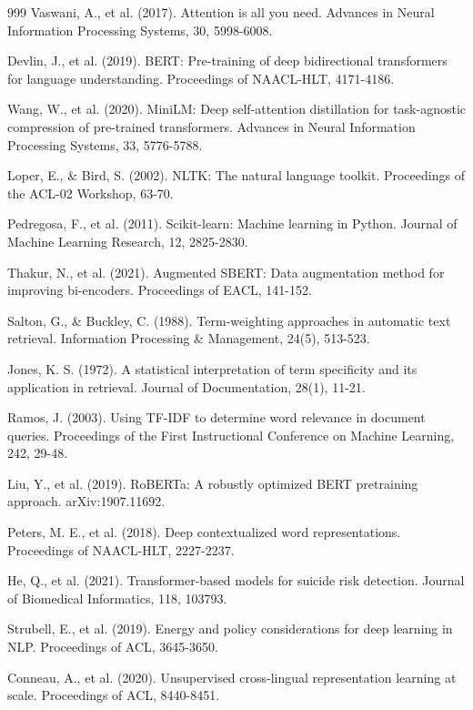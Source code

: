 \begin{thebibliography}{999}
 Vaswani, A., et al. (2017). Attention is all you need. Advances in Neural Information Processing Systems, 30, 5998-6008.

 Devlin, J., et al. (2019). BERT: Pre-training of deep bidirectional transformers for language understanding. Proceedings of NAACL-HLT, 4171-4186.

 Wang, W., et al. (2020). MiniLM: Deep self-attention distillation for task-agnostic compression of pre-trained transformers. Advances in Neural Information Processing Systems, 33, 5776-5788.

 Loper, E., \& Bird, S. (2002). NLTK: The natural language toolkit. Proceedings of the ACL-02 Workshop, 63-70.

 Pedregosa, F., et al. (2011). Scikit-learn: Machine learning in Python. Journal of Machine Learning Research, 12, 2825-2830.

 Thakur, N., et al. (2021). Augmented SBERT: Data augmentation method for improving bi-encoders. Proceedings of EACL, 141-152.

 Salton, G., \& Buckley, C. (1988). Term-weighting approaches in automatic text retrieval. Information Processing \& Management, 24(5), 513-523.

 Jones, K. S. (1972). A statistical interpretation of term specificity and its application in retrieval. Journal of Documentation, 28(1), 11-21.

 Ramos, J. (2003). Using TF-IDF to determine word relevance in document queries. Proceedings of the First Instructional Conference on Machine Learning, 242, 29-48.

 Liu, Y., et al. (2019). RoBERTa: A robustly optimized BERT pretraining approach. arXiv:1907.11692.

 Peters, M. E., et al. (2018). Deep contextualized word representations. Proceedings of NAACL-HLT, 2227-2237.

 He, Q., et al. (2021). Transformer-based models for suicide risk detection. Journal of Biomedical Informatics, 118, 103793.

 Strubell, E., et al. (2019). Energy and policy considerations for deep learning in NLP. Proceedings of ACL, 3645-3650.

 Conneau, A., et al. (2020). Unsupervised cross-lingual representation learning at scale. Proceedings of ACL, 8440-8451.


\end{thebibliography}
